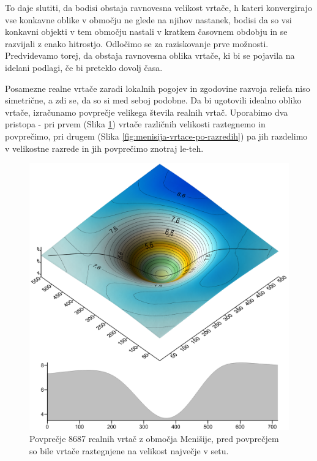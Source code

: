 \documentclass[a4paper, oneside, 12pt]{book}
\begin{document}
  To daje slutiti, da bodisi obstaja ravnovesna velikost vrtače, h kateri konvergirajo vse konkavne oblike v območju ne glede na njihov nastanek, bodisi da so vsi konkavni objekti v tem območju nastali v kratkem časovnem obdobju in se razvijali z enako hitrostjo. Odločimo se za raziskovanje prve možnosti.
  Predvidevamo torej, da obstaja ravnovesna oblika vrtače, ki bi se pojavila na idelani podlagi, če bi preteklo dovolj časa.

  Posamezne realne vrtače zaradi lokalnih pogojev in zgodovine razvoja reliefa niso simetrične, a zdi se, da so si med seboj podobne. Da bi ugotovili idealno obliko vrtače, izračunamo povprečje velikega števila realnih vrtač. Uporabimo dva pristopa - pri prvem (Slika \ref{fig:menisija-vrtaca}) vrtače različnih velikosti raztegnemo in povprečimo, pri drugem (Slika \ref{fig:menisija-vrtace-po-razredih}) pa jih razdelimo v velikostne razrede in jih povprečimo znotraj le-teh. 

  \begin{figure}[H]
    \centering
    \includegraphics[width=13cm]{slike/menisija-vrtaca}
    \caption{Povprečje 8687 realnih vrtač z območja Menišije, pred povprečjem so bile vrtače raztegnjene na velikost največje v setu.}
    \label{fig:menisija-vrtaca}
  \end{figure}
\end{document}
